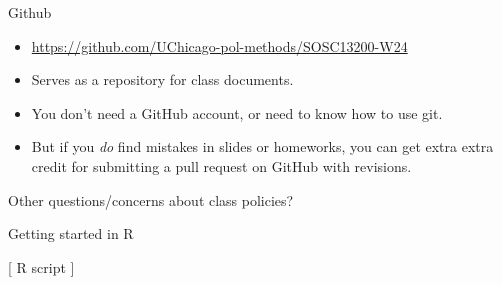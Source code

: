 \documentclass[xcolor={dvipsnames}]{beamer}
\begin{document}
\begin{frame}{Github}

\begin{itemize}
\item \url{https://github.com/UChicago-pol-methods/SOSC13200-W24}\pause
\item Serves as a repository for class documents. \pause
\item You don't need a GitHub account, or need to know how to use git. \pause
\item But if you \textit{do} find mistakes in slides or homeworks, you can get extra extra credit for submitting a pull request on GitHub with revisions. 
\end{itemize}

\end{frame}



\begin{frame}

\begin{center}
Other questions/concerns about class policies?
\end{center}

\end{frame}



\begin{frame}{Getting started in R}

\begin{center}
{[} R script {]}
\end{center}

\end{frame}




\end{document}
